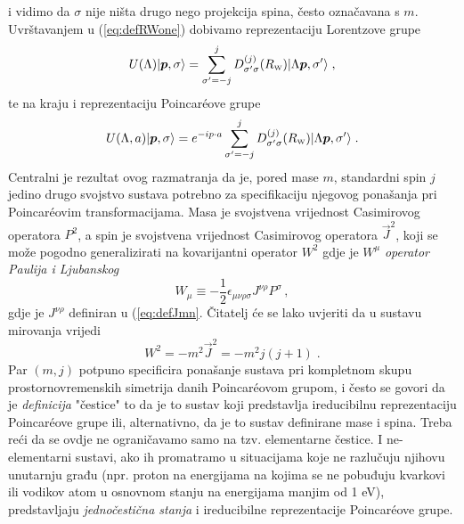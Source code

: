 i vidimo da $\sigma$ nije ništa drugo nego projekcija spina, često označavana s $m$.
Uvrštavanjem u (\ref{eq:defRWone}) dobivamo reprezentaciju Lorentzove
grupe
\begin{equation}
    U(\Lambda) \ket{\vec{p}, \sigma} = 
     \sum_{\sigma'=-j}^{j} D^{(j)}_{\sigma'\sigma}(R_{\scriptscriptstyle\rm W})
     \ket{\Lambda\vec{p}, \sigma'} \;,
\end{equation}
te na kraju i reprezentaciju Poincar\'{e}ove grupe
\begin{equation}
    U(\Lambda, a) \ket{\vec{p}, \sigma} =  e^{-i p \cdot a}
     \sum_{\sigma'=-j}^{j} D^{(j)}_{\sigma'\sigma}(R_{\scriptscriptstyle\rm W})
     \ket{\Lambda\vec{p}, \sigma'} \;.
\end{equation}
Centralni je rezultat ovog razmatranja da je, pored mase $m$, standardni spin $j$
jedino drugo svojstvo sustava potrebno za specifikaciju njegovog ponašanja
pri Poincar\'{e}ovim transformacijama.
Masa je svojstvena vrijednost Casimirovog operatora $P^2$, a spin
je svojstvena vrijednost Casimirovog operatora $\vec{J}^2$, koji se
može pogodno generalizirati na kovarijantni operator $W^2$ gdje je
$W^{\mu}$ \emph{operator Paulija i Ljubanskog}
\begin{equation}
    W_{\mu} \equiv - \frac{1}{2} \epsilon_{\mu \nu \rho \sigma}
    J^{\nu \rho} P^{\sigma} \,,
    \label{eq:defPLj}
\end{equation}
gdje je $J^{\nu \rho}$ definiran u (\ref{eq:defJmn}.
Čitatelj će se lako uvjeriti da u sustavu mirovanja vrijedi
\begin{equation}
    W^2 = - m^2 \vec{J}^2 = -m^2 j (j+1) \;.
\end{equation}
Par $(m, j)$ potpuno specificira ponašanje sustava pri kompletnom skupu
prostornovremenskih simetrija danih Poincar\'{e}ovom grupom, i često se
govori da je \emph{definicija} "čestice" to da je to sustav koji predstavlja
ireducibilnu reprezentaciju Poincar\'{e}ove grupe ili, alternativno,
da je to sustav definirane mase i spina.
Treba reći da se ovdje ne ograničavamo samo na tzv. elementarne čestice.
I ne-elementarni sustavi, ako ih promatramo u situacijama koje ne razlučuju
njihovu unutarnju građu (npr. proton na energijama na kojima se ne pobuđuju
kvarkovi ili vodikov atom u osnovnom stanju na energijama manjim od 1 eV),
predstavljaju \emph{jednočestična stanja} i ireducibilne reprezentacije
Poincar\'{e}ove grupe.

